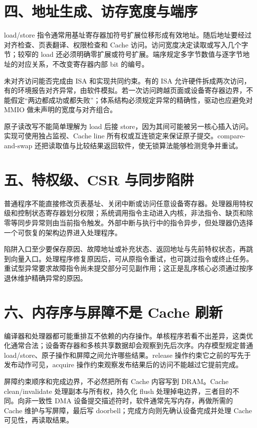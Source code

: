 \section{四、地址生成、访存宽度与端序}

load/store 指令通常用基址寄存器加符号扩展位移形成有效地址。随后地址要经过对齐检查、页表翻译、权限检查和 Cache 访问。访问宽度决定读取或写入几个字节；较窄的 load 还必须明确零扩展或符号扩展。端序规定多字节数值与逐字节地址的对应关系，不改变寄存器内部 bit 的编号。

未对齐访问能否完成由 ISA 和实现共同约束。有的 ISA 允许硬件拆成两次访问，有的环境报告对齐异常，由软件模拟。若一次访问跨越页面或设备寄存器边界，不能假定“两边都成功或都失败”；体系结构必须规定异常的精确性，驱动也应避免对 MMIO 做未声明的宽度与对齐组合。

原子读改写不能简单理解为 load 后接 store，因为其间可能被另一核心插入访问。实现可使用独占监视、Cache line 所有权或互连锁定来保证原子提交。compare-and-swap 还把读取值与比较结果返回软件，使无锁算法能够检测竞争并重试。

\section{五、特权级、CSR 与同步陷阱}

普通程序不能直接修改页表基址、关闭中断或访问任意设备寄存器。处理器用特权级和控制状态寄存器划分权限；系统调用指令主动进入内核，非法指令、缺页和除零等同步异常则由当前指令触发。外部中断与执行中的指令异步，但处理器仍选择一个可恢复的架构边界进入处理程序。

陷阱入口至少要保存原因、故障地址或补充状态、返回地址与先前特权状态，再跳到向量入口。处理程序修复原因后，可从原指令重试，也可跳过指令或终止任务。重试型异常要求故障指令尚未提交部分可见副作用；这正是乱序核心必须通过按序退休维护精确异常的原因。

\section{六、内存序与屏障不是 Cache 刷新}

编译器和处理器都可能重排互不依赖的内存操作。单核程序若看不出差异，这类优化通常合法；设备寄存器和多核共享数据却会观察到先后次序。内存模型规定普通 load/store、原子操作和屏障之间允许哪些结果。release 操作约束它之前的写先于发布动作可见，acquire 操作约束观察发布结果后的访问不能越过它提前完成。

屏障约束顺序和完成边界，不必然把所有 Cache 内容写到 DRAM。Cache clean/invalidate 处理副本与所有权，持久化 flush 处理掉电边界，三者目的不同。向非一致性 DMA 设备提交描述符时，软件通常先写内存，再做所需的 Cache 维护与写屏障，最后写 doorbell；完成方向则先确认设备完成并处理 Cache 可见性，再读取结果。

